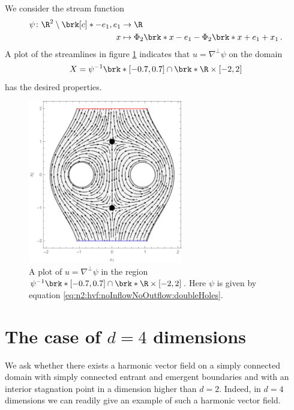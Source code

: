 \begin{example}
  We consider the stream function
  \begin{equation}
    \begin{aligned}
    \psi\colon\R^2\setminus\brk[c]*{-e_1,e_1}&\to\R \\
    x&\mapsto\Phi_2\brk*{x-e_1}-\Phi_2\brk*{x+e_1}+x_1\,.
    \end{aligned}\label{eq:n2:hvf:noInflowNoOutflow:doubleHoles}
  \end{equation}
  A plot of the streamlines in figure \ref{pl:n2_hvf_InflowOutflow_symmetric_region} indicates that $u=\nabla^\perp\psi$ 
  on the domain
  $$X=\psi^{-1}\brk*{[-0.7,0.7]}\cap \brk*{\R\times[-2,2]}$$
  has the desired properties.
  \begin{figure}
    \centering
    \includegraphics[width=0.6\textwidth]{../Plots/n2_hvf_InflowOutflow_symmetric_gray_2.pdf}
    \caption{A plot of $u=\nabla^\perp\psi$ in the region $\psi^{-1}\brk*{[-0.7,0.7]}\cap \brk*{\R\times[-2,2]}$.
    Here $\psi$ is given by equation \eqref{eq:n2:hvf:noInflowNoOutflow:doubleHoles}.}
    \label{pl:n2_hvf_InflowOutflow_symmetric_region}
  \end{figure}
\end{example}

\section{The case of $d=4$ dimensions}

We ask whether there exists a harmonic vector field on a simply connected domain with simply connected entrant and emergent boundaries and with an interior stagnation point 
in a dimension higher than $d=2$. Indeed, in $d=4$ dimensions we can readily give an example
of such a harmonic vector field.

